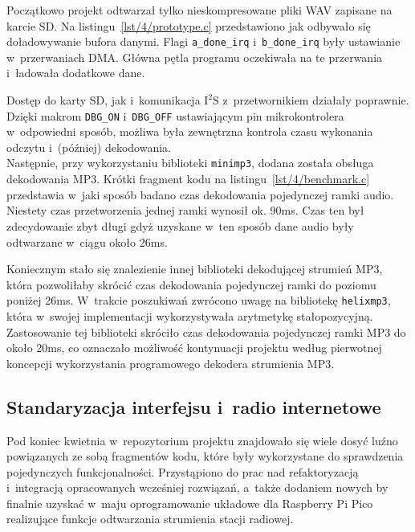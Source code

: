 \documentclass[polish]{aghengthesis}
\newcommand{\isqs}{$\text{I}^{2}\text{S}$}
\newcommand{\lstfile}[3]{
	\noindent
	\hspace{0.1\linewidth}
	\begin{minipage}{0.8\linewidth}
		
	\end{minipage}
	\vspace{0.3cm}
}
\begin{document}
			Początkowo projekt odtwarzał tylko nieskompresowane pliki WAV zapisane na karcie SD. Na listingu~\ref{lst/4/prototype.c} przedstawiono jak odbywało się doładowywanie bufora danymi. Flagi \lstinline|a_done_irq| i~\lstinline|b_done_irq| były ustawianie w~przerwaniach DMA. Główna pętla programu oczekiwała na te przerwania i~ładowała dodatkowe dane.
			
			\lstfile{c}{Realizacja podstawowego ładowania bufora}{lst/4/prototype.c}
			
			Dostęp do karty SD, jak i~komunikacja \isqs{} z~przetwornikiem działały poprawnie. Dzięki makrom \lstinline|DBG_ON| i~\lstinline|DBG_OFF| ustawiającym pin mikrokontrolera w~odpowiedni sposób, możliwa była zewnętrzna kontrola czasu wykonania odczytu i~(później) dekodowania.
			$ $\\
			
			Następnie, przy wykorzystaniu biblioteki \lstinline|minimp3|\textsuperscript{\cite{minimp3}}, dodana została obsługa dekodowania MP3. Krótki fragment kodu na listingu~\ref{lst/4/benchmark.c} przedstawia w~jaki sposób badano czas dekodowania pojedynczej ramki audio. Niestety czas przetworzenia jednej ramki wynosił ok. 90ms.
			Czas ten był zdecydowanie zbyt długi gdyż uzyskane w~ten sposób dane audio  były odtwarzane w~ciągu około 26ms.

			\lstfile{c}{Pomiar czasu dekodowania ramki MP3}{lst/4/benchmark.c}
			
			Koniecznym stało się znalezienie innej biblioteki dekodującej strumień MP3, która pozwoliłaby skrócić czas dekodowania pojedynczej ramki do poziomu poniżej 26ms. W~trakcie poszukiwań zwrócono uwagę na bibliotekę \lstinline|helixmp3|, która w~swojej implementacji wykorzystywała arytmetykę stałopozycyjną. Zastosowanie tej biblioteki skróciło czas dekodowania pojedynczej ramki MP3 do około 20ms, co oznaczało możliwość kontynuacji projektu według pierwotnej koncepcji wykorzystania programowego dekodera strumienia MP3.
			
		\subsection{Standaryzacja interfejsu i~radio internetowe}
			Pod koniec kwietnia w~repozytorium projektu znajdowało się wiele dosyć luźno powiązanych ze sobą fragmentów kodu, które były wykorzystane do sprawdzenia pojedynczych funkcjonalności.
			Przystąpiono do prac nad refaktoryzacją i~integracją opracowanych wcześniej rozwiązań, a~także dodaniem nowych by finalnie uzyskać w~maju oprogramowanie układowe dla Raspberry Pi Pico realizujące funkcje odtwarzania strumienia stacji radiowej.
			$ $\\
			
\end{document}

